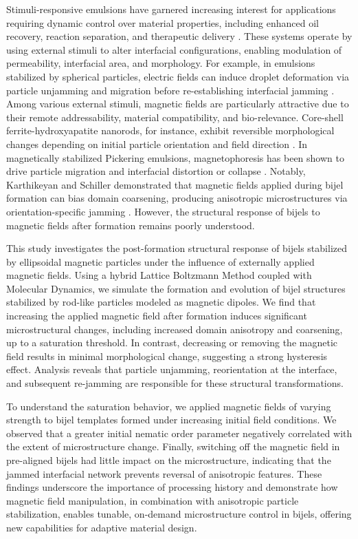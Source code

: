Stimuli-responsive emulsions have garnered increasing interest for applications requiring dynamic control over material properties, including enhanced oil recovery, reaction 
separation, and therapeutic delivery \cite{tham_magnetophoresis_2021, cui_stabilizing_2013, rozynek_opening_2019, lu_controllable_2020}. These systems operate by using 
external stimuli to alter interfacial configurations, enabling modulation of permeability, interfacial area, and morphology. For example, in emulsions stabilized by 
spherical particles, electric fields can induce droplet deformation via particle unjamming and migration before re-establishing interfacial jamming \cite{cui_stabilizing_2013}. 
Among various external stimuli, magnetic fields are particularly attractive due to their remote addressability, material compatibility, and bio-relevance. 
Core-shell ferrite-hydroxyapatite nanorods, for instance, exhibit reversible morphological changes depending on initial particle orientation and field direction 
\cite{nakayama_stimuli-responsive_2018}. In magnetically stabilized Pickering emulsions, magnetophoresis has been shown to drive particle migration and interfacial 
distortion or collapse \cite{tham_magnetophoresis_2021, yang_rapid_2020, misra_magnetic_2020}. Notably, Karthikeyan and Schiller demonstrated that magnetic fields applied 
during bijel formation can bias domain coarsening, producing anisotropic microstructures via orientation-specific jamming \cite{karthikeyan_formation_2024}. However, the 
structural response of bijels to magnetic fields after formation remains poorly understood.

This study investigates the post-formation structural response of bijels stabilized by ellipsoidal magnetic particles under the influence of externally applied magnetic fields. 
Using a hybrid Lattice Boltzmann Method coupled with Molecular Dynamics, we simulate the formation and evolution of bijel structures stabilized by rod-like particles modeled as 
magnetic dipoles. We find that increasing the applied magnetic field after formation induces significant microstructural changes, including increased domain anisotropy and 
coarsening, up to a saturation threshold. In contrast, decreasing or removing the magnetic field results in minimal morphological change, suggesting a strong hysteresis effect. 
Analysis reveals that particle unjamming, reorientation at the interface, and subsequent re-jamming are responsible for these structural transformations.

To understand the saturation behavior, we applied magnetic fields of varying strength to bijel templates formed under increasing initial field conditions. We observed that 
a greater initial nematic order parameter negatively correlated with the extent of microstructure change. Finally, switching off the magnetic field in pre-aligned bijels had little 
impact on the microstructure, indicating that the jammed interfacial network prevents reversal of anisotropic features. These findings underscore the importance of processing 
history and demonstrate how magnetic field manipulation, in combination with anisotropic particle stabilization, enables tunable, on-demand microstructure control in bijels, 
offering new capabilities for adaptive material design.


